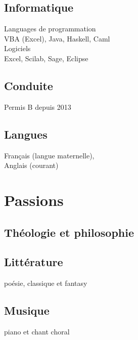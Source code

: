 \documentclass[]{cv-template}
\begin{document}
\begin{minipage}[t]{0.34\textwidth}
\subsection{Informatique}
\mycaret Languages de programmation\\
VBA (Excel), Java, Haskell, Caml\\
\mycaret Logiciels \\
Excel, Scilab, Sage, Eclipse\\
\sectionsep

\subsection{Conduite}
Permis B depuis 2013
  
\sectionsep
\subsection{Langues}
\mycaret  Français (langue maternelle), \\
\mycaret  Anglais (courant) \\
\sectionsep



\section{Passions}
\subsection{Théologie et philosophie}
\sectionsep
\subsection{Littérature}
poésie, classique et fantasy\\
\subsection{Musique}
piano et chant choral\\


\end{minipage}
\end{document}
